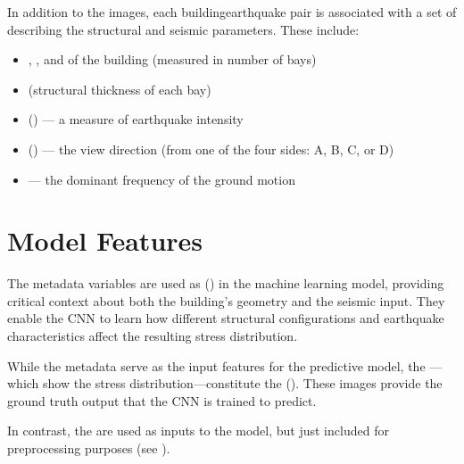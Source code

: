 \documentclass[letterpaper,10pt,english]{sphinxmanual}
\begin{document}
\sphinxAtStartPar
In addition to the images, each building\sphinxhyphen{}earthquake pair is associated with a
set of  describing the structural and seismic parameters.
These include:
\begin{itemize}
\item {} 
\sphinxAtStartPar
{}, , and  of the building (measured in number of bays)

\item {} 
\sphinxAtStartPar
{} (structural thickness of each bay)

\item {} 
\sphinxAtStartPar
{} () — a measure of earthquake intensity

\item {} 
\sphinxAtStartPar
{} () — the view direction (from one of the four sides: A, B, C, or D)

\item {} 
\sphinxAtStartPar
{} — the dominant frequency of the ground motion

\end{itemize}


\section{Model Features}
\label{\detokenize{data:model-features}}
\sphinxAtStartPar
The metadata variables are used as  () in the machine
learning model, providing critical context about both the building’s geometry
and the seismic input.
They enable the CNN to learn how different structural configurations and
earthquake characteristics affect the resulting stress distribution.

\sphinxAtStartPar
While the metadata serve as the input features for the predictive model,
the —which show the stress distribution—constitute
the  ().
These images provide the ground truth output that the CNN is trained to predict.

\sphinxAtStartPar
In contrast, the  are  used as inputs to the
model, but just included for preprocessing purposes  (see {\hyperref[\detokenize{data:preprocessing}]{}}).
\end{document}
